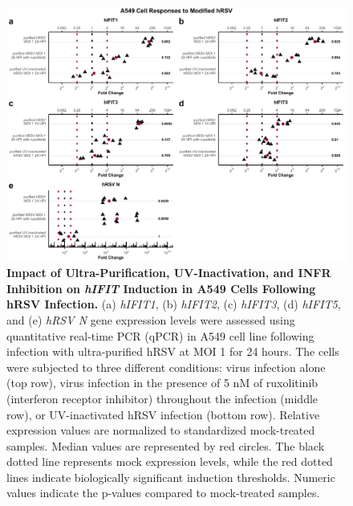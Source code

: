 \begin{figure}
    \centering
    \includegraphics[width=1\linewidth]{06. Chapter 1/Figs/01. Induction/07. a549_hrsv_uv_roxo.pdf}
    \caption[Impact of Ultra-Purification, UV-Inactivation, and INFR Inhibition on \textit{hIFIT} Induction in A549 Cells Following hRSV Infection.]{\textbf{Impact of Ultra-Purification, UV-Inactivation, and INFR Inhibition on \textit{hIFIT} Induction in A549 Cells Following hRSV Infection.} (a) \textit{hIFIT1}, (b) \textit{hIFIT2}, (c) \textit{hIFIT3}, (d) \textit{hIFIT5}, and (e) \textit{hRSV N} gene expression levels were assessed using quantitative real-time PCR (qPCR) in A549 cell line following infection with ultra-purified hRSV at MOI 1 for 24 hours. The cells were subjected to three different conditions: virus infection alone (top row), virus infection in the presence of 5 nM of ruxolitinib (interferon receptor inhibitor) throughout the infection (middle row), or UV-inactivated hRSV infection (bottom row). Relative expression values are normalized to standardized mock-treated samples. Median values are represented by red circles. The black dotted line represents mock expression levels, while the red dotted lines indicate biologically significant induction thresholds. Numeric values indicate the p-values compared to mock-treated samples.}
    \label{fig:The effect of ultra-purification, UV-inactivation and INFR inhibition on hIFIT induction following hRSV infection in A549}
\end{figure}

